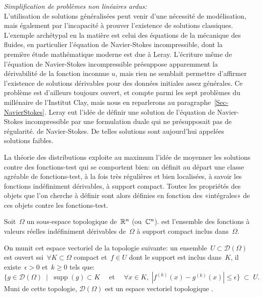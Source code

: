 \begin{histoire}
\medskip
\noindent\emph{Simplification de problèmes non linéaires ardus:}\\[+2.5mm]
L'utilisation de solutions généralisées peut venir d'une nécessité de modélisation, mais également par l'incapacité à prouver l'existence de solutions classiques. L'exemple archétypal en la matière est celui des équations de la mécanique des fluides, en particulier l'équation de Navier-Stokes incompressible, dont la première étude mathématique moderne est due à Leray. L'écriture même de l'équation de Navier-Stokes incompressible présuppose apparemment la dérivabilité de la fonction inconnue $u$, mais rien ne semblait permettre d'affirmer l'existence de solutions dérivables pour des données initiales assez générales. Ce problème est d'ailleurs toujours ouvert, et compte parmi les sept problèmes du millénaire de l'Institut Clay, mais nous en reparlerons au paragraphe~\ref{Sec-NavierStokes}. Leray eut l'idée de définir une solution de l'équation de Navier-Stokes incompressible par une formulation duale qui ne présupposait pas de régularité. de Navier-Stokes. De telles solutions sont aujourd'hui appelées solutions faibles.

\medskip
La théorie des distributions exploite au maximum l'idée de moyenner les solutions contre des fonctions-test qui se comportent bien: on définit au départ une classe agréable de fonctions-test, à la fois très régulières et bien localisées, à savoir les fonctions indéfiniment dérivables, à support compact. Toutes les propriétés des objets que l'on cherche à définir sont alors définies en fonction des «intégrales» de ces objets contre les fonctions-test.
\end{histoire}

\medskip
\begin{definition}
Soit~$\Omega$ un sous-espace topologique de~$\mathbb R^n$ (ou~$\mathbb C^n$).
 est l'ensemble des fonctions à valeurs réelles indéfiniment dérivables de~$\Omega$ à support compact inclus dans~$\Omega$.

On munit cet espace vectoriel de la topologie suivante: un ensemble~$U \subset \mathcal{D}(\Omega)$ est ouvert ssi~$\forall K \subset \Omega$ compact et~$f \in U$ dont le support est inclus dans~$K$, il existe~$\epsilon > 0$ et~$k \ge 0$ tels que:
\begin{equation}
  \{ g \in \mathcal{D}(\Omega)\;\mid\; \operatorname{supp}(g) \subset K\quad\text{ et }\quad\forall x \in K,\; |f^{(k)}(x)-g^{(k)}(x)|\le \epsilon \}\;\subset\;U.
\end{equation}
Muni de cette topologie, $\mathcal{D}(\Omega)$ est un espace vectoriel topologique .
\end{definition}

